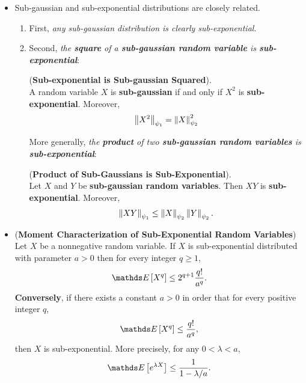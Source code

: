 \documentclass[11pt]{article}
\begin{document}
\begin{itemize}
\item \begin{remark}
Sub-gaussian and sub-exponential distributions are closely related. 
\begin{enumerate}
\item First, \emph{any sub-gaussian distribution is clearly sub-exponential}. 
\item Second, \emph{the \textbf{square} of a \textbf{sub-gaussian random variable} is \textbf{sub-exponential}}:
\begin{lemma} (\textbf{Sub-exponential is Sub-gaussian Squared}).  \citep{vershynin2018high}\\
A random variable  $X$ is \textbf{sub-gaussian} if and only if $X^2$ is \textbf{sub-exponential}. Moreover,
\begin{align*}
\left\|X^2\right\|_{\psi_1} = \left\|X\right\|_{\psi_2}^2
\end{align*}
\end{lemma}

More generally, \emph{the \textbf{product} of two \textbf{sub-gaussian random variables} is \textbf{sub-exponential}}:
\begin{lemma} (\textbf{Product of Sub-Gaussians is Sub-Exponential}).  \citep{vershynin2018high}\\
Let $X$ and $Y$ be \textbf{sub-gaussian random variables}. Then $XY$ is \textbf{sub-exponential}. Moreover,
\begin{align*}
\left\|XY\right\|_{\psi_1} \le \left\|X\right\|_{\psi_2} \left\|Y\right\|_{\psi_2}.
\end{align*}
\end{lemma}
\end{enumerate}
\end{remark}

\item \begin{proposition} (\textbf{Moment Characterization of Sub-Exponential Random Variables})  \citep{boucheron2013concentration}\\
Let $X$ be a nonnegative random variable. If $X$ is sub-exponential distributed with parameter $a > 0$ 
then for every integer $q \ge 1$,
\begin{align}
\E{}{X^{q}} \le 2^{q+1}\frac{q!}{a^q}. \label{eqn: sub_exponential_power_moment}
\end{align}
\textbf{Conversely}, if there exists a constant $a > 0$ in order that for every positive integer $q$,
\begin{align*}
\E{}{X^{q}} \le  \frac{q!}{a^q},
\end{align*} then $X$ is sub-exponential. More precisely, for any $0 < \lambda < a$, 
\begin{align*}
\E{}{e^{\lambda X}} \le \frac{1}{1 - \lambda /a}.
\end{align*}
\end{proposition}


\end{itemize}
\end{document}
